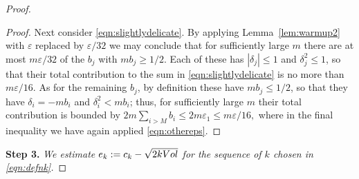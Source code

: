\documentclass[10pt,a4paper]{amsart}
\newcommand{\NI}{{\noindent}}
\newcommand{\Vol}{{\rm Vol}}
\newcommand{\de}{{\delta}}
\newcommand{\eps}{\varepsilon}
\begin{document}
\begin{proof}
\begin{proof}
Next consider \eqref{eqn:slightlydelicate}.  By applying Lemma~\ref{lem:warmup2} with $\eps$ replaced by $\eps/32$  we may conclude that
for sufficiently large $m$ there are at most $m \eps/32$ of the $b_j$ with $m b_j \ge 1/2$.  Each of these has $|\delta_j| \le 1$ and $\delta_j^2 \le 1$, so that their total contribution to the sum in \eqref{eqn:slightlydelicate} is no more than $m \eps/16$.  As for the remaining $b_j$, by definition these have $mb_j \le 1/2$, so that they have $\delta_i = - mb_i$ and $\de_i^2< mb_i$; thus, for sufficiently large $m$ their total contribution is bounded by $2 m \sum_{i > M} b_i \le 2 m \eps_1 \le m\eps/16,$ where in the final inequality we have again applied \eqref{eqn:othereps}.
\end{proof}

\NI {\bf Step 3.} {\it We estimate $e_k:=c_k - \sqrt{2k \Vol}$ for the sequence of  $k$ chosen in \eqref{eqn:defnk}.}


\end{proof}
\end{document}
